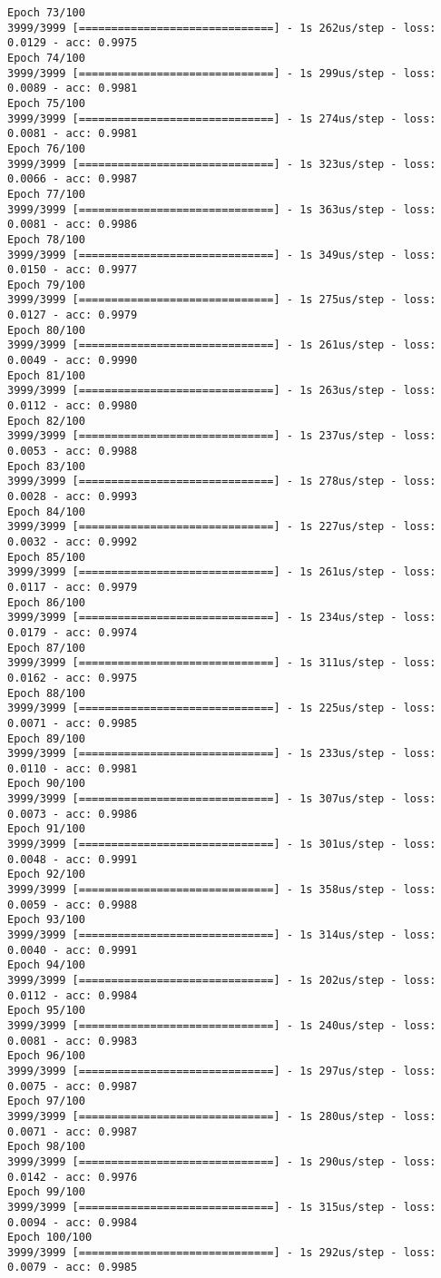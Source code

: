 \documentclass[11pt]{article}
\begin{document}
\begin{Verbatim}[commandchars=\\\{\}]
Epoch 73/100
3999/3999 [==============================] - 1s 262us/step - loss: 0.0129 - acc: 0.9975
Epoch 74/100
3999/3999 [==============================] - 1s 299us/step - loss: 0.0089 - acc: 0.9981
Epoch 75/100
3999/3999 [==============================] - 1s 274us/step - loss: 0.0081 - acc: 0.9981
Epoch 76/100
3999/3999 [==============================] - 1s 323us/step - loss: 0.0066 - acc: 0.9987
Epoch 77/100
3999/3999 [==============================] - 1s 363us/step - loss: 0.0081 - acc: 0.9986
Epoch 78/100
3999/3999 [==============================] - 1s 349us/step - loss: 0.0150 - acc: 0.9977
Epoch 79/100
3999/3999 [==============================] - 1s 275us/step - loss: 0.0127 - acc: 0.9979
Epoch 80/100
3999/3999 [==============================] - 1s 261us/step - loss: 0.0049 - acc: 0.9990
Epoch 81/100
3999/3999 [==============================] - 1s 263us/step - loss: 0.0112 - acc: 0.9980
Epoch 82/100
3999/3999 [==============================] - 1s 237us/step - loss: 0.0053 - acc: 0.9988
Epoch 83/100
3999/3999 [==============================] - 1s 278us/step - loss: 0.0028 - acc: 0.9993
Epoch 84/100
3999/3999 [==============================] - 1s 227us/step - loss: 0.0032 - acc: 0.9992
Epoch 85/100
3999/3999 [==============================] - 1s 261us/step - loss: 0.0117 - acc: 0.9979
Epoch 86/100
3999/3999 [==============================] - 1s 234us/step - loss: 0.0179 - acc: 0.9974
Epoch 87/100
3999/3999 [==============================] - 1s 311us/step - loss: 0.0162 - acc: 0.9975
Epoch 88/100
3999/3999 [==============================] - 1s 225us/step - loss: 0.0071 - acc: 0.9985
Epoch 89/100
3999/3999 [==============================] - 1s 233us/step - loss: 0.0110 - acc: 0.9981
Epoch 90/100
3999/3999 [==============================] - 1s 307us/step - loss: 0.0073 - acc: 0.9986
Epoch 91/100
3999/3999 [==============================] - 1s 301us/step - loss: 0.0048 - acc: 0.9991
Epoch 92/100
3999/3999 [==============================] - 1s 358us/step - loss: 0.0059 - acc: 0.9988
Epoch 93/100
3999/3999 [==============================] - 1s 314us/step - loss: 0.0040 - acc: 0.9991
Epoch 94/100
3999/3999 [==============================] - 1s 202us/step - loss: 0.0112 - acc: 0.9984
Epoch 95/100
3999/3999 [==============================] - 1s 240us/step - loss: 0.0081 - acc: 0.9983
Epoch 96/100
3999/3999 [==============================] - 1s 297us/step - loss: 0.0075 - acc: 0.9987
Epoch 97/100
3999/3999 [==============================] - 1s 280us/step - loss: 0.0071 - acc: 0.9987
Epoch 98/100
3999/3999 [==============================] - 1s 290us/step - loss: 0.0142 - acc: 0.9976
Epoch 99/100
3999/3999 [==============================] - 1s 315us/step - loss: 0.0094 - acc: 0.9984
Epoch 100/100
3999/3999 [==============================] - 1s 292us/step - loss: 0.0079 - acc: 0.9985

    \end{Verbatim}
\end{document}
